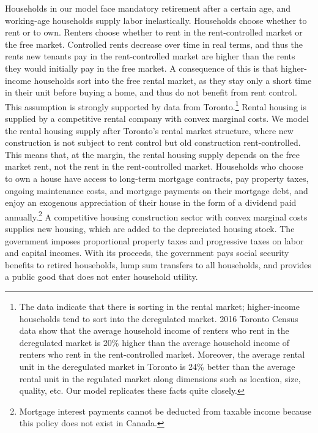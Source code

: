 \documentclass[parskip=full]{article}
\begin{document}
Households in our model face mandatory retirement after a certain age, and working-age households supply labor inelastically. Households choose whether to rent or to own. Renters choose whether to rent in the rent-controlled market or the free market. Controlled rents decrease over time in real terms, and thus the rents new tenants pay in the rent-controlled market are higher than the rents they would initially pay in the free market. A consequence of this is that higher-income households sort into the free rental market, as they stay only a short time in their unit before buying a home, and thus do not benefit from rent control. This assumption is strongly supported by data from Toronto.\footnote{The data indicate that there is sorting in the rental market; higher-income households tend to sort into the deregulated market. 2016 Toronto Census data show that the average household income of renters who rent in the deregulated market is 20\% higher than the average household income of renters who rent in the rent-controlled market. Moreover, the average rental unit in the deregulated market in Toronto is 24\% better than the average rental unit in the regulated market \citep{zhang-gou} along dimensions such as location, size, quality, etc. Our model replicates these facts quite closely.} Rental housing is supplied by a competitive rental company with convex marginal costs. We model the rental housing supply after Toronto's rental market structure, where new construction is not subject to rent control but old construction rent-controlled. This means that, at the margin, the rental housing supply depends on the free market rent, not the rent in the rent-controlled market. Households who choose to own a house have access to long-term mortgage contracts, pay property taxes, ongoing maintenance costs, and mortgage payments on their mortgage debt, and enjoy an exogenous appreciation of their house in the form of a dividend paid annually.\footnote{Mortgage interest payments cannot be deducted from taxable income because this policy does not exist in Canada.} A competitive housing construction sector with convex marginal costs supplies new housing, which are added to the depreciated housing stock. The government imposes proportional property taxes and progressive taxes on labor and capital incomes. With its proceeds, the government pays social security benefits to retired households, lump sum transfers to all households, and provides a public good that does not enter household utility. 
\end{document}
